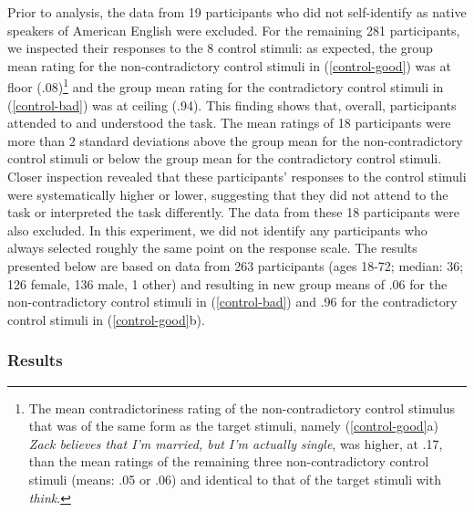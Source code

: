 \documentclass[11pt,fleqn]{article}
\newcommand{\6}{\mbox{$[\hspace*{-.6mm}[$}}
\newcommand{\9}{\mbox{$]\hspace*{-.6mm}]$}}
\begin{document}
{Prior to analysis, the data from 19 participants who did not self-identify as native speakers of American English were excluded. For the remaining 281 participants, we inspected their responses to the 8 control stimuli: as expected, the group mean rating for the non-contradictory control stimuli in (\ref{control-good}) was at floor (.08)\footnote{The mean contradictoriness rating of the non-contradictory control stimulus that was of the same form as the target stimuli, namely (\ref{control-good}a) {\em Zack believes that I'm married, but I'm actually single}, was higher, at .17, than the mean ratings of the remaining three non-contradictory control stimuli (means: .05 or .06) and identical to that of the target stimuli with {\em think}.}  and the group mean rating for the contradictory control stimuli in (\ref{control-bad}) was at ceiling (.94). This finding shows that, overall, participants attended to and understood the task. The mean ratings of 18 participants were more than 2 standard deviations above the group mean for the non-contradictory control stimuli or below the group mean for the contradictory control stimuli. Closer inspection revealed that these participants' responses to the control stimuli were systematically higher or lower, suggesting that they did not attend to the task or interpreted the task differently. The data from these 18 participants were also excluded. In this experiment, we did not identify any participants who always selected roughly the same point on the response scale. The results presented below are based on data from 263 participants (ages 18-72; median: 36; 126 female, 136 male, 1 other) and resulting in new group means of .06 for the non-contradictory control stimuli in (\ref{control-bad}) and .96 for the contradictory control stimuli in (\ref{control-good}b). 

\subsubsection{Results}

}
\end{document}
